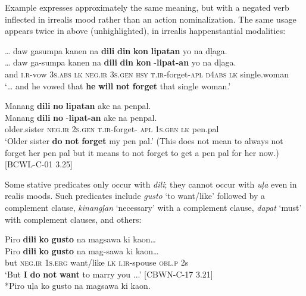 Example  expresses approximately the same meaning, but with a negated verb inflected in irrealis mood rather than an action nominalization. The same usage appears twice in  above (unhighlighted), in irrealis happenstantial modalities:

\newpage
\ea
\label{bkm:Ref446680856}
… daw  gasumpa  kanen  na  \textbf{dili}  \textbf{din}  \textbf{kon}  \textbf{lipatan}  yo na  dļaga. \\\smallskip
\gll … daw  ga-sumpa  kanen  na  \textbf{dili}  \textbf{din}  \textbf{kon}  \emptyset{}-\textbf{lipat-an}  yo na  dļaga. \\
{} and  \textsc{i.r}-vow  3\textsc{s.abs}  \textsc{lk}  \textsc{neg.ir}  3\textsc{s.gen}  \textsc{hsy}  \textsc{t.ir}-forget-\textsc{apl}  \textsc{d4abs}
\textsc{lk}  single.woman \\
\glt `… and he vowed that \textbf{he} \textbf{will} \textbf{not} \textbf{forget} that single woman.’
\z

\ea
Manang  \textbf{dili}  \textbf{no}  \textbf{lipatan}  ake  na  penpal. \\\smallskip
\gll Manang  \textbf{dili}  \textbf{no}  \emptyset{}-\textbf{lipat-an}  ake  na  penpal. \\
older.sister  \textsc{neg.ir}  2\textsc{s.gen}  \textsc{t.ir}-forget- \textsc{apl}  1\textsc{s.gen}  \textsc{lk}  pen.pal \\
\glt ‘Older sister \textbf{do} \textbf{not} \textbf{forget} my pen pal.’ (This does not mean to always not forget her pen pal but it means to not forget to get a pen pal for her now.) [BCWL-C-01 3.25]
\z

Some stative predicates only occur with \textit{dili}; they cannot occur with \textit{uļa} even in realis moods. Such predicates include \textit{gusto} ‘to want/like’ followed by a complement clause, \textit{kinangļan} ‘necessary’ with a complement clause, \textit{dapat} ‘must’ with complement clauses, and others:

\ea
Piro  \textbf{dili}  \textbf{ko}  \textbf{gusto}  na  magsawa  ki  kaon… \\\smallskip
\gll Piro  \textbf{dili}  \textbf{ko}  \textbf{gusto}  na  mag-sawa  ki  kaon… \\
but  \textsc{neg.ir}  1\textsc{s.erg}  want/like  \textsc{lk}  \textsc{i.ir}-spouse  \textsc{obl.p}  2s \\
\glt ‘But \textbf{I} \textbf{do} \textbf{not} \textbf{want} to marry you ...’ [CBWN-C-17 3.21] \\\smallskip
*Piro uļa ko gusto na magsawa ki kaon.
\z

